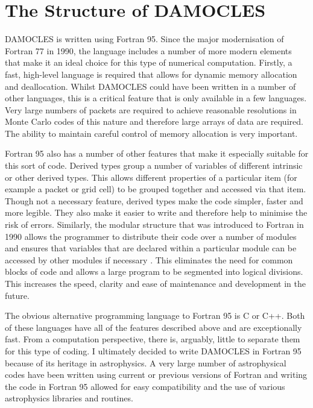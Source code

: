         \section{The Structure of DAMOCLES}
        \label{damocles_struct}
        
        DAMOCLES is written using Fortran 95.  Since the major modernisation of Fortran 77 in 1990, the language includes a number of more modern elements that make it an ideal choice for this type of numerical computation.  Firstly, a fast, high-level language is required that allows for dynamic memory allocation and deallocation.  Whilst DAMOCLES could have been written in a number of other languages, this is a critical feature that is only available in a few languages.  Very large numbers of packets are required to achieve reasonable resolutions in Monte Carlo codes of this nature and therefore  large arrays of data are required.  The ability to maintain careful control of memory allocation is very important.  
        
        Fortran 95 also has a number of other features that make it especially suitable for this sort of code.  Derived types group a number of variables of different intrinsic or other derived types.  This allows different properties of a particular item (for example a packet or grid cell) to be grouped together and accessed via that item. Though not a necessary feature, derived types make the code simpler, faster and more legible.  They also make it easier to write and therefore help to minimise the risk of errors.  Similarly, the modular structure that was introduced to Fortran in 1990 allows the programmer to distribute their code over a number of modules and ensures that variables that are declared within a particular module can be accessed by other modules if necessary \citep{Ellis1994}.  This eliminates the need for common blocks of code and allows a large program to be segmented into logical divisions.  This increases the speed, clarity and ease of maintenance and development in the future.
        
        The obvious alternative programming language to Fortran 95 is C or C++.  Both of these languages have all of the features described above and are exceptionally fast.  From a computation perspective, there is, arguably, little to separate them for this type of coding.  I ultimately decided to write DAMOCLES in Fortran 95 because of its heritage in astrophysics.  A very large number of astrophysical codes have been written using current or previous versions of Fortran and writing the code in Fortran 95 allowed for easy compatibility and the use of various astrophysics libraries and routines.
        
